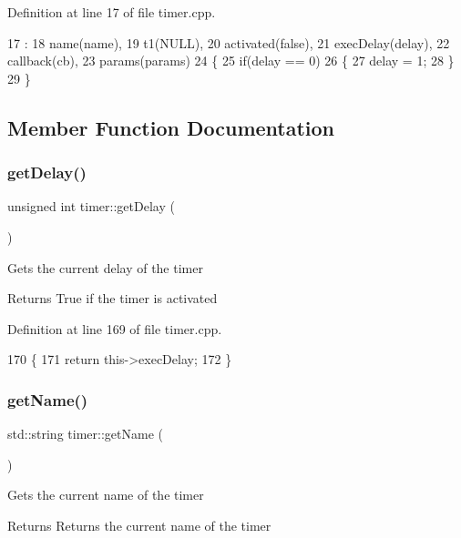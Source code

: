 Definition at line 17 of file timer.\+cpp.


\begin{DoxyCode}
17                                                                                     :
18     name(name),
19     t1(NULL),
20     activated(\textcolor{keyword}{false}),
21     execDelay(delay),
22     callback(cb),
23     params(params)
24 \{
25     \textcolor{keywordflow}{if}(delay == 0)
26     \{
27         delay = 1;
28     \}
29 \}
\end{DoxyCode}


\subsection{Member Function Documentation}
\mbox{\label{classtimer_ab00cba4ccf638a425b9f6db10d2fd16f}} 
\subsubsection{\texorpdfstring{get\+Delay()}{getDelay()}}
{\footnotesize\ttfamily unsigned int timer\+::get\+Delay (\begin{DoxyParamCaption}{ }\end{DoxyParamCaption})}

Gets the current delay of the timer \begin{DoxyReturn}{Returns}
True if the timer is activated 
\end{DoxyReturn}


Definition at line 169 of file timer.\+cpp.


\begin{DoxyCode}
170 \{
171    \textcolor{keywordflow}{return} this->execDelay;
172 \}
\end{DoxyCode}
\mbox{\label{classtimer_a30d5e497b9bee9b2d00c7f511c85e84d}} 
\subsubsection{\texorpdfstring{get\+Name()}{getName()}}
{\footnotesize\ttfamily std\+::string timer\+::get\+Name (\begin{DoxyParamCaption}{ }\end{DoxyParamCaption})}

Gets the current name of the timer \begin{DoxyReturn}{Returns}
Returns the current name of the timer 
\end{DoxyReturn}



